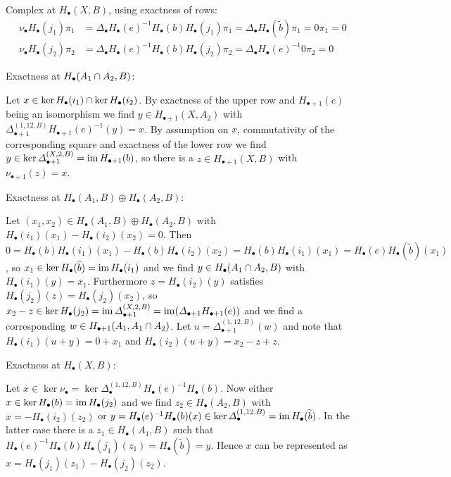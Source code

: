 \begin{sketch}
		Complex at $H_\bullet(X,B)$, using exactness of rows:
		\begin{align*}
			\nu_\bullet H_\bullet(j_1)\pi_1 &= \Delta_\bullet H_\bullet(e)^{-1}H_\bullet(b)H_\bullet(j_1)\pi_1 = \Delta_\bullet H_\bullet(\widetilde{b})\pi_1 = 0\pi_1 = 0\\
			\nu_\bullet H_\bullet(j_2)\pi_2 &= \Delta_\bullet H_\bullet(e)^{-1}H_\bullet(b)H_\bullet(j_2)\pi_2 = \Delta_\bullet H_\bullet(e)^{-1}0\pi_2 = 0
		\end{align*}

		Exactness at $H_\bullet(A_1\cap A_2,B)$:
		\begin{tab}
			Let $x \in \ker H_\bullet(i_1) \cap \ker H_\bullet(i_2)$. By exactness of the upper row and $H_{\bullet+1}(e)$ being an isomorphism we find $y \in H_{\bullet+1}(X,A_2)$ with $\Delta_{\bullet+1}^{(1,12,B)}H_{\bullet+1}(e)^{-1}(y) = x$. By assumption on $x$, commutativity of the corresponding square and exactness of the lower row we find $y \in \ker \Delta_{\bullet+1}^{(X,2,B)} = \operatorname{im} H_{\bullet+1}(b)$, so there is a $z \in H_{\bullet+1}(X,B)$ with $\nu_{\bullet+1}(z) = x$.
		\end{tab}

		Exactness at $H_\bullet(A_1,B) \oplus H_\bullet(A_2,B)$:
		\begin{tab}
			Let $(x_1,x_2) \in H_\bullet(A_1,B) \oplus H_\bullet(A_2,B)$ with $H_\bullet(i_1)(x_1) - H_\bullet(i_2)(x_2) = 0$. Then $0 = H_\bullet(b)H_\bullet(i_1)(x_1) - H_\bullet(b)H_\bullet(i_2)(x_2) = H_\bullet(b)H_\bullet(i_1)(x_1) = H_\bullet(e) H_\bullet(\widetilde{b})(x_1)$, so $x_1 \in \ker H_\bullet(\widetilde{b}) = \operatorname{im} H_\bullet(i_1)$ and we find $y \in H_\bullet(A_1 \cap A_2, B)$ with $H_\bullet(i_1)(y) = x_1$. Furthermore $z = H_\bullet(i_2)(y)$ satisfies $H_\bullet(j_2)(z) = H_\bullet(j_2)(x_2)$, so $x_2-z \in \ker H_\bullet(j_2) = \operatorname{im} \Delta_{\bullet+1}^{(X,2,B)} = \operatorname{im} (\Delta_{\bullet+1}H_{\bullet+1}(e))$ and we find a corresponding $w \in H_{\bullet+1}(A_1,A_1\cap A_2)$. Let $u = \Delta_{\bullet+1}^{(1,12,B)}(w)$ and note that $H_\bullet(i_1)(u+y) = 0+x_1$ and $H_\bullet(i_2)(u+y) = x_2 - z + z$.
		\end{tab}

		Exactness at $H_\bullet(X,B)$:
		\begin{tab}
			Let $x \in \ker \nu_\bullet = \ker \Delta_\bullet^{(1,12,B)}H_\bullet(e)^{-1}H_\bullet(b)$. Now either  $x \in \ker H_\bullet(b) = \operatorname{im} H_\bullet(j_2)$ and we find $z_2 \in H_\bullet(A_2,B)$ with $x = -H_\bullet(i_2)(z_2)$ or $y = H_\bullet(e)^{-1}H_\bullet(b)(x) \in \ker \Delta_\bullet^{(1,12,B)} = \operatorname{im} H_\bullet(\widetilde{b})$. In the latter case there is a $z_1 \in H_\bullet(A_1,B)$ such that $H_\bullet(e)^{-1}H_\bullet(b)H_\bullet(j_1)(z_1) = H_\bullet(\widetilde{b}) = y$. Hence $x$ can be represented as $x = H_\bullet(j_1)(z_1) - H_\bullet(j_2)(z_2)$.
		\end{tab}
	\end{sketch}

